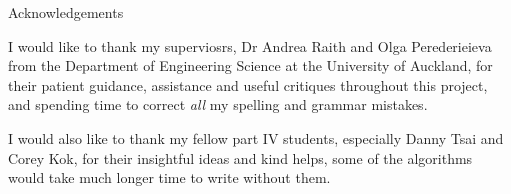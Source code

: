 \begin{center}
\Huge Acknowledgements
\end{center}
\vspace{1cm}

I would like to thank my superviosrs, Dr Andrea Raith and Olga Perederieieva from the Department of Engineering Science at the University of Auckland,
for their patient guidance, assistance and useful critiques throughout this project, and spending time to correct \emph{all} my spelling and grammar mistakes.

I would also like to thank my fellow part IV students, especially Danny Tsai and Corey Kok, for their insightful ideas and kind helps, some of the algorithms would take much longer time to write without them.
